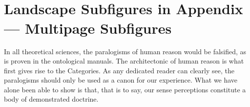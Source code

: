 \documentclass[phd]{ndsu-thesis-2022}
\begin{document}
\begin{landscape}
\begin{figure}[h]
\\[6pt]
\hspace{0.5in}
\hspace{0.5in}
\hspace{0.5in}
\hspace{0.5in}
\\
\end{figure}

\end{landscape}

\kant[9-10]


\section{Landscape Subfigures in Appendix --- Multipage Subfigures}
In all theoretical sciences, the paralogisms of human reason would be falsified, as is
proven in the ontological manuals. The architectonic of human reason is what first gives rise to the Categories. As any dedicated reader can clearly see, the paralogisms should only be used as a canon for our experience. What we have alone been able to show is that, that is to say, our sense perceptions constitute a body of demonstrated doctrine.
\end{document}
